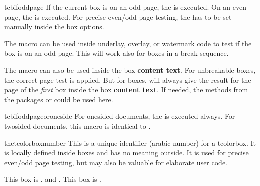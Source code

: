 \clearpage
\begin{docCommand}[doc new=2015-11-13]{tcbifoddpage}{}
If the current box is on an odd page, the  is executed.
On an even page, the  is executed.
For precise even/odd page testing, the  has to be
set manually inside the box options.

The macro  can be used inside underlay, overlay, or watermark code to
test if the box is on an odd page. This will work also for boxes in a break sequence.

The macro can also be used inside the box \textbf{content text}. For unbreakable boxes,
the correct page test is applied.
But for  boxes, 
will always give the result for the page of the \emph{first} box inside
the box \textbf{content text}. If needed, the methods from the packages
 or  could be used here.

\begin{dispExample}

\begin{tcolorbox}[enhanced,check odd page,
  title={Example for a box on an \tcbifoddpage{odd}{even} page},
  watermark text={\tcbifoddpage{Odd}{Even} page!}]
\lipsum[1]
\end{tcolorbox}
\end{dispExample}
\end{docCommand}


\begin{docCommand}[doc new=2016-11-18]{tcbifoddpageoroneside}{}
  For onesided documents, the  is executed always.
  For twosided documents, this macro is identical to .
\end{docCommand}

\clearpage
\begin{docCommand}[doc new=2015-11-13]{thetcolorboxnumber}{}
This is a unique identifier (arabic number) for a tcolorbox. It is locally
defined inside boxes and has no meaning outside. It is used for
precise even/odd page testing, but may also be valuable for elaborate user
code.

\begin{dispExample}
\begin{tcolorbox}[colback=yellow!5,title=Box \thetcolorboxnumber]
  This box is \thetcolorboxnumber.
   and
  .
  This box is \thetcolorboxnumber.
\end{tcolorbox}
\end{dispExample}
\end{docCommand}


